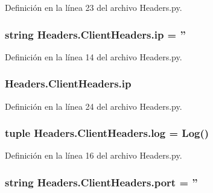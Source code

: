 Definición en la línea 23 del archivo Headers.\-py.

\hypertarget{class_headers_1_1_client_headers_a15b94d4c64d520378cf021770469ff74}{
\subsubsection[{ip}]{\setlength{\rightskip}{0pt plus 5cm}string Headers.\-Client\-Headers.\-ip = ''\hspace{0.3cm}{\ttfamily [static]}}}\label{class_headers_1_1_client_headers_a15b94d4c64d520378cf021770469ff74}


Definición en la línea 14 del archivo Headers.\-py.

\hypertarget{class_headers_1_1_client_headers_a3b830916eb5f486466733a631debd80f}{
\subsubsection[{ip}]{\setlength{\rightskip}{0pt plus 5cm}Headers.\-Client\-Headers.\-ip}}\label{class_headers_1_1_client_headers_a3b830916eb5f486466733a631debd80f}


Definición en la línea 24 del archivo Headers.\-py.

\hypertarget{class_headers_1_1_client_headers_a5502fdd869b7ab7185c1049cbe5a534c}{
\subsubsection[{log}]{\setlength{\rightskip}{0pt plus 5cm}tuple Headers.\-Client\-Headers.\-log = {\bf Log}()\hspace{0.3cm}{\ttfamily [static]}}}\label{class_headers_1_1_client_headers_a5502fdd869b7ab7185c1049cbe5a534c}


Definición en la línea 16 del archivo Headers.\-py.

\hypertarget{class_headers_1_1_client_headers_a6f9c18e89358e04c9c869aec27095d74}{
\subsubsection[{port}]{\setlength{\rightskip}{0pt plus 5cm}string Headers.\-Client\-Headers.\-port = ''\hspace{0.3cm}{\ttfamily [static]}}}\label{class_headers_1_1_client_headers_a6f9c18e89358e04c9c869aec27095d74}


